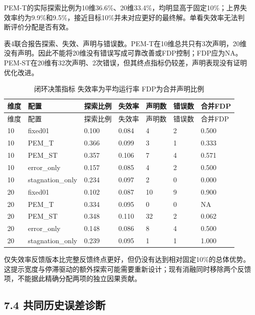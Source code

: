 \documentclass[11pt,a4paper]{article}
\begin{document}
PEM-T的实际探索比例为10维36.6\%、20维33.4\%，均明显高于固定10\%；上界失效率约为9.9\%和9.5\%，接近目标10\%并未对应更好的最终解。单看失效率无法判断评价分配是否有效。

表4联合报告探索、失效、声明与错误数。PEM-T在10维总共只有3次声明，20维没有声明。因此不能将20维没有错误写成可靠改善或FDP控制；FDP应为NA。PEM-ST在20维有32次声明、2次错误，但其终点指标仍较差，声明表现没有证明优化改进。

\par\noindent\begin{minipage}{\linewidth}

\begin{longtable}[]{@{}lllllll@{}}
\caption{闭环决策指标 失效率为平均运行率
FDP为合并声明比例}\tabularnewline
\toprule
维度 & 配置 & 探索比例 & 失效率 & 声明数 & 错误数 & 合并FDP \\
\midrule
\endfirsthead
\toprule
维度 & 配置 & 探索比例 & 失效率 & 声明数 & 错误数 & 合并FDP \\
\midrule
\endhead
10 & fixed01 & 0.100 & 0.084 & 4 & 2 & 0.500 \\
10 & PEM\_T & 0.366 & 0.099 & 3 & 1 & 0.333 \\
10 & PEM\_ST & 0.357 & 0.106 & 7 & 4 & 0.571 \\
10 & error\_only & 0.157 & 0.085 & 4 & 2 & 0.500 \\
10 & stagnation\_only & 0.234 & 0.097 & 2 & 0 & 0.000 \\
20 & fixed01 & 0.102 & 0.087 & 10 & 9 & 0.900 \\
20 & PEM\_T & 0.334 & 0.095 & 0 & 0 & NA \\
20 & PEM\_ST & 0.348 & 0.110 & 32 & 2 & 0.062 \\
20 & error\_only & 0.148 & 0.086 & 8 & 4 & 0.500 \\
20 & stagnation\_only & 0.239 & 0.095 & 1 & 1 & 1.000 \\
\bottomrule
\end{longtable}

\end{minipage}\par

仅失效率反馈版本比完整反馈终点更好，但仍没有达到相对固定10\%的总体优势。这提示宽度与停滞驱动的额外探索可能需要重新设计；现有消融同时移除两个反馈项，不能据此精确分配两项的独立因果贡献。

\hypertarget{ux5171ux540cux5386ux53f2ux8befux5deeux8bcaux65ad}{%
\subsection{7.4
共同历史误差诊断}\label{ux5171ux540cux5386ux53f2ux8befux5deeux8bcaux65ad}}
\end{document}
